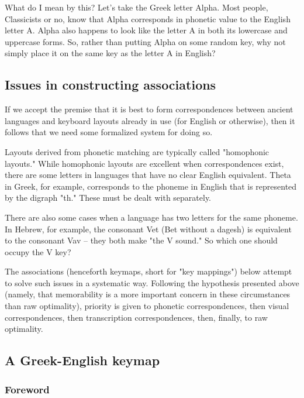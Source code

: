 \documentclass[11pt]{article}
\begin{document}
What do I mean by this? Let's take the Greek letter Alpha. Most people, Classicists or no, know that Alpha corresponds in phonetic value to the English letter A. Alpha also happens to look like the letter A in both its lowercase and uppercase forms. So, rather than putting Alpha on some random key, why not simply place it on the same key as the letter A in English?

\subsection{Issues in constructing associations}
\label{sec:orgb3f5fe5}

If we accept the premise that it is best to form correspondences between ancient languages and keyboard layouts already in use (for English or otherwise), then it follows that we need some formalized system for doing so.

Layouts derived from phonetic matching are typically called "homophonic layouts." While homophonic layouts are excellent when correspondences exist, there are some letters in languages that have no clear English equivalent. Theta in Greek, for example, corresponds to the phoneme in English that is represented by the digraph "th." These must be dealt with separately.

There are also some cases when a language has two letters for the same phoneme. In Hebrew, for example, the consonant Vet (Bet without a dagesh) is equivalent to the consonant Vav -- they both make "the V sound." So which one should occupy the V key?

The associations (henceforth keymaps, short for "key mappings") below attempt to solve such issues in a systematic way. Following the hypothesis presented above (namely, that memorability is a more important concern in these circumstances than raw optimality), priority is given to phonetic correspondences, then visual correspondences, then transcription correspondences, then, finally, to raw optimality.

\subsection{A Greek-English keymap}
\label{sec:orgf84eae5}

\subsubsection{Foreword}
\label{sec:org95f6e98}
\end{document}
